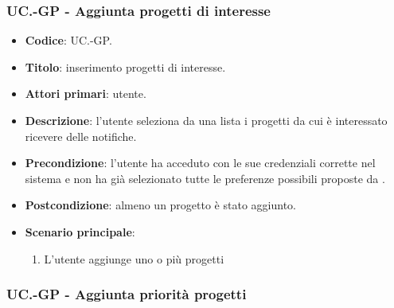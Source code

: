     \subsubsection{UC\theuccount.\thesubuccount-GP - Aggiunta progetti di interesse}
    
    \begin{itemize}
        \item \textbf{Codice}: UC\theuccount.\thesubuccount-GP.
        \item \textbf{Titolo}: inserimento progetti di interesse.
        \item \textbf{Attori primari}: utente.
        \item \textbf{Descrizione}: l'utente seleziona da una lista i progetti da cui è interessato ricevere delle notifiche.
        \item \textbf{Precondizione}: l’utente ha acceduto con le sue credenziali corrette nel sistema e non ha già selezionato tutte le preferenze possibili proposte da \progetto.
        \item \textbf{Postcondizione}: almeno un progetto è stato aggiunto.
        \item \textbf{Scenario principale}:
        \begin{enumerate}
            \item L'utente aggiunge uno o più progetti
        \end{enumerate}
    \end{itemize}
    
    \subsubsection{UC\theuccount.\thesubuccount-GP - Aggiunta priorità progetti}
    
